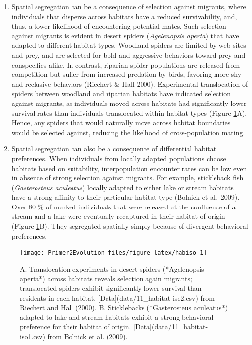 \documentclass[
]{book}
\begin{document}
\begin{enumerate}
\def\labelenumi{(\arabic{enumi})}
\item
  Spatial segregation can be a consequence of selection against migrants, where individuals that disperse across habitats have a reduced survivability, and, thus, a lower likelihood of encountering potential mates. Such selection against migrants is evident in desert spiders (\emph{Agelenopsis aperta}) that have adapted to different habitat types. Woodland spiders are limited by web-sites and prey, and are selected for bold and aggressive behaviors toward prey and conspecifics alike. In contrast, riparian spider populations are released from competition but suffer from increased predation by birds, favoring more shy and reclusive behaviors (Riechert \& Hall 2000). Experimental translocation of spiders between woodland and riparian habitats have indicated selection against migrants, as individuals moved across habitats had significantly lower survival rates than individuals translocated within habitat types (Figure \ref{fig:habiso}A). Hence, any spiders that would naturally move across habitat boundaries would be selected against, reducing the likelhood of cross-population mating.
\item
  Spatial segregation can also be a consequence of differential habitat preferences. When individuals from locally adapted populations choose habitats based on suitability, interpopulation encounter rates can be low even in absence of strong selection against migrants. For example, stickleback fish (\emph{Gasterosteus aculeatus}) locally adapted to either lake or stream habitats have a strong affinity to their particular habitat type (Bolnick et al.~2009). Over 80 \% of marked individuals that were released at the confluence of a stream and a lake were eventually recaptured in their habitat of origin (Figure \ref{fig:habiso}B). They segregated spatially simply because of divergent behavioral preferences.
\end{enumerate}

\begin{figure}
\texttt{[image: Primer2Evolution\_files/figure-latex/habiso-1]} \caption{A. Translocation experiments in desert spiders (*Agelenopsis aperta*) across habitats reveals selection again migrants; translocated spiders exhibit significantly lower survival than residents in each habitat. [Data](data/11_habitat-iso2.csv) from Riechert and Hall (2000). B. Sticklebacks (*Gasterosteus aculeatus*) adapted to lake and stream habitats exhibit a strong behavioral preference for their habitat of origin. [Data](data/11_habitat-iso1.csv) from Bolnick et al. (2009).}\label{fig:habiso}
\end{figure}
\end{document}
